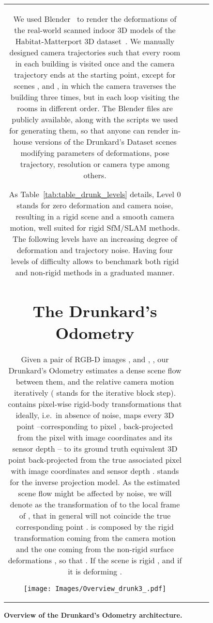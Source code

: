 \documentclass{article}
\begin{document}
\begin{figure}
\begin{tabular}{cccc}
We used Blender~\cite{blender} to render the deformations of the  real-world scanned indoor 3D models of the Habitat-Matterport 3D dataset~\cite{ramakrishnan2021habitat}.
We manually designed camera trajectories such that every room in each building is visited once and the camera trajectory ends at the starting point, except for scenes ,  and , in which the camera traverses the building three times, but in each loop visiting the rooms in different order. The Blender files are publicly available, along with the scripts we used for generating them, so that anyone can render in-house versions of the Drunkard's Dataset scenes modifying parameters of deformations, pose trajectory, resolution or camera type among others.

As Table~\ref{tab:table_drunk_levels} details, Level 0 stands for zero deformation and camera noise, resulting in a rigid scene and a smooth camera motion, well suited for rigid SfM/SLAM methods. 
The following levels have an increasing degree of deformation and trajectory noise. Having four levels of difficulty allows to benchmark both rigid and non-rigid methods in a graduated manner.


\section{The Drunkard's Odometry}  \label{sec:drunkSLAM}
Given a pair of RGB-D images ,  and , , our Drunkard's Odometry estimates a dense scene flow  between them, and the relative camera motion  iteratively ( stands for the iterative block step). 
 contains pixel-wise rigid-body transformations that ideally, i.e.\ in absence of noise, maps every 3D point  --corresponding to pixel , back-projected from the pixel with image coordinates  and its sensor depth -- to its ground truth equivalent 3D point  back-projected from the true associated pixel with image coordinates  and sensor depth .  stands for the inverse projection model. As the estimated scene flow  might be affected by noise, we will denote as 
the transformation of  to the local frame of , that in general will not coincide the true corresponding point .  is composed by the rigid transformation coming from the camera motion  and the one coming from the non-rigid surface deformations , so that . If the scene is rigid , and if it is deforming . 

\begin{figure*}[ht!]
    \centering
    \texttt{[image: Images/Overview\_drunk3\_.pdf]}
    \caption{\textbf{Overview of the Drunkard's Odometry architecture.} 
    }
    \label{fig:overview}
\end{figure*}


\end{tabular}
\end{figure}
\end{document}
